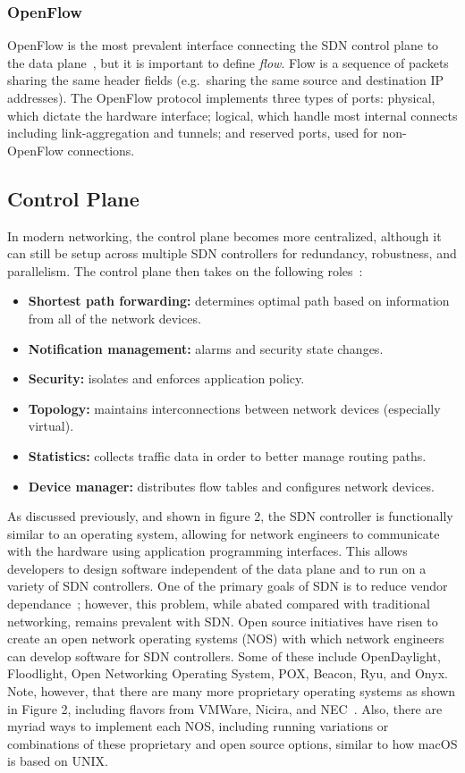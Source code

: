 \documentclass[11pt]{article}
\begin{document}
\subsubsection{OpenFlow}

OpenFlow is the most prevalent interface connecting the SDN control plane to the data plane~\cite{Coker}, but it is important to define \textit{flow}. Flow is a sequence of packets \cite{Stallings} sharing the same header fields (e.g.~sharing the same source and destination IP addresses). The OpenFlow protocol implements three types of ports: physical, which dictate the hardware interface; logical, which handle most internal connects including link-aggregation and tunnels; and reserved ports, used for non-OpenFlow connections.

\subsection{Control Plane}

In modern networking, the control plane becomes more centralized, although it can still be setup across multiple SDN controllers for redundancy, robustness, and parallelism. The control plane then takes on the following roles~\cite{Stallings}:
\begin{itemize}
	\item \textbf{Shortest path forwarding:} determines optimal path based on information from all of the network devices.
	\item \textbf{Notification management:} alarms and security state changes.
	\item \textbf{Security:} isolates and enforces application policy.
	\item \textbf{Topology:} maintains interconnections between network devices (especially virtual).
	\item \textbf{Statistics:} collects traffic data in order to better manage routing paths.
	\item \textbf{Device manager:} distributes flow tables and configures network devices.
\end{itemize}

As discussed previously, and shown in figure 2, the SDN controller is functionally similar to an operating system, allowing for network engineers to communicate with the hardware using application programming interfaces. This allows developers to design software independent of the data plane and to run on a variety of SDN controllers. One of the primary goals of SDN is to reduce vendor dependance~\cite{White}; however, this problem, while abated compared with traditional networking, remains prevalent with SDN. Open source initiatives have risen to create an open network operating systems (NOS) with which network engineers can develop software for SDN controllers. Some of these include OpenDaylight, Floodlight, Open Networking Operating System, POX, Beacon, Ryu, and Onyx. Note, however, that there are many more proprietary operating systems as shown in Figure 2, including flavors from VMWare, Nicira, and NEC~\cite{Nadeau}. Also, there are myriad ways to implement each NOS, including running variations or combinations of these proprietary and open source options, similar to how macOS is based on UNIX.
\end{document}
